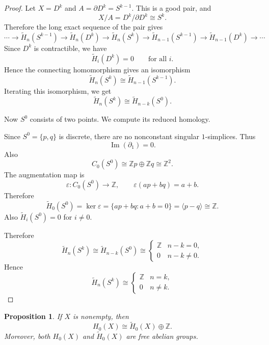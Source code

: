 \documentclass[11pt,a4paper]{article}
\theoremstyle{definition}
\theoremstyle{plain}
\newtheorem{proposition}[definition]{Proposition}
\theoremstyle{remark}
\newcommand{\1}{\mathbbm{1}}
\begin{document}
\begin{proof}
    Let $X = D^k$ and $A = \partial D^k = S^{k-1}$. This is a good pair, and
    \[
        X/A = D^k/\partial D^k \cong S^k.
    \]
    Therefore the long exact sequence of the pair gives
    \[
        \cdots \to \widetilde H_n(S^{k-1})
        \to \widetilde H_n(D^k)
        \to \widetilde H_n(S^k)
        \to \widetilde H_{n-1}(S^{k-1})
        \to \widetilde H_{n-1}(D^k)
        \to \cdots
    \]
    Since $D^k$ is contractible, we have
    \[
        \widetilde H_i(D^k) = 0
        \qquad \text{for all } i.
    \]
    Hence the connecting homomorphism gives an isomorphism
    \[
        \widetilde H_n(S^k) \cong \widetilde H_{n-1}(S^{k-1}).
    \]
    Iterating this isomorphism, we get
    \[
        \widetilde H_n(S^k)
        \cong
        \widetilde H_{n-k}(S^0).
    \]

    Now $S^0$ consists of two points. We compute its reduced homology.

    Since $S^0 = \{p,q\}$ is discrete, there are no nonconstant singular $1$-simplices. Thus
    \[
        \operatorname{Im}(\partial_1) = 0.
    \]
    Also
    \[
        C_0(S^0) \cong \mathbb Z p \oplus \mathbb Z q \cong \mathbb Z^2.
    \]
    The augmentation map is
    \[
        \varepsilon : C_0(S^0) \to \mathbb Z,
        \qquad
        \varepsilon(ap + bq) = a+b.
    \]
    Therefore
    \[
        \widetilde H_0(S^0)
        =
        \ker \varepsilon
        =
        \{ap+bq : a+b=0\}
        =
        \langle p-q\rangle
        \cong \mathbb Z.
    \]
    Also $\widetilde H_i(S^0)=0$ for $i \neq 0$.

    Therefore
    \[
        \widetilde H_n(S^k)
        \cong
        \widetilde H_{n-k}(S^0)
        \cong
        \begin{cases}
            \mathbb Z & n-k=0,\\
            0 & n-k\neq 0.
        \end{cases}
    \]
    Hence
    \[
        \widetilde H_n(S^k) \cong 
        \begin{cases}
            \mathbb Z & n = k,\\
            0 & n \neq k.
        \end{cases}
    \]
\end{proof}

\begin{proposition}
If $X$ is nonempty, then
\[
H_0(X) \cong \widetilde H_0(X)\oplus \mathbb Z.
\]
Moreover, both $H_0(X)$ and $\widetilde H_0(X)$ are free abelian groups.
\end{proposition}
\end{document}

